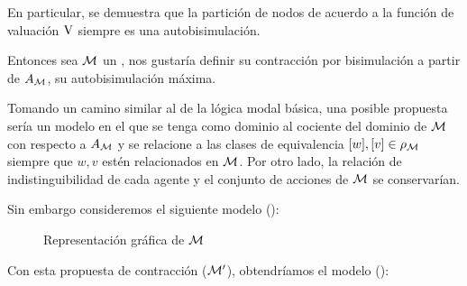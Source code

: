 En particular, se demuestra que la partición de nodos de acuerdo a la función de valuación $\mathrm{V}$ siempre es una autobisimulación.

Entonces sea $\mathcal{M}$ un \ults, nos gustaría definir su contracción por bisimulación a partir de $A_{\mathcal{M}}$, su autobisimulación máxima.

Tomando un camino similar al de la lógica modal básica, una posible propuesta sería un modelo en el que se tenga como dominio al cociente 
del dominio de $\mathcal{M}$ con respecto a $A_{\mathcal{M}}$ y se relacione a las clases de equivalencia $[w], [v] \in \rho_{\mathcal{M}}$ siempre que 
$w, v$ estén relacionados en $\mathcal{M}$. Por otro lado, la relación de indistinguibilidad de cada agente y el conjunto de acciones de $\mathcal{M}$ se conservarían.

Sin embargo consideremos el siguiente modelo ():

\begin{figure}[h]
    \hspace{3.4cm}
    \vspace{0.1cm}
    \hspace{1cm}
    \caption{Representación gráfica de $\mathcal{M}$}
    \label{fig:1stproposaloriginal}
\end{figure}

Con esta propuesta de contracción ($\mathcal{M}'$), obtendríamos el modelo ():

